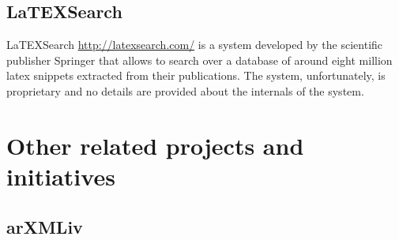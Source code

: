 \subsection{LaTEXSearch}
LaTEXSearch \url{http://latexsearch.com/} is a system developed by the scientific publisher Springer that allows to search over a database of around eight million latex snippets extracted from their publications. The system, unfortunately, is proprietary and no details are provided about the internals of the system.
	 
\section{Other related projects and initiatives}
\subsection{arXMLiv}
\thispagestyle{empty}